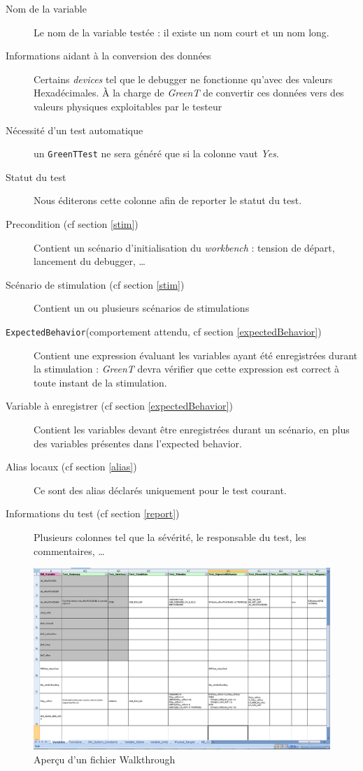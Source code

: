 		\begin{description} 
			\item[Nom de la variable] Le nom de la variable testée : il existe un nom court et un nom long.
			\item[Informations aidant à la conversion des données] Certains \textit{devices} tel que le debugger ne fonctionne qu'avec des valeurs Hexadécimales. À la charge de \textit{GreenT} de convertir ces données vers des valeurs physiques exploitables par le testeur
			\item[Nécessité d'un test automatique] un \texttt{GreenTTest} ne sera généré que si la colonne vaut \textit{Yes}.
			\item[Statut du test] Nous éditerons cette colonne afin de reporter le statut du test.
			\item[Precondition (cf section \ref{stim})] Contient un scénario d'initialisation du \textit{workbench} : tension de départ, lancement du debugger, \ldots
			\item[Scénario de stimulation (cf section \ref{stim})] Contient un ou plusieurs scénarios de stimulations
			\item[\texttt{ExpectedBehavior}(comportement attendu, cf section \ref{expectedBehavior})] Contient une expression évaluant les variables ayant été enregistrées durant la stimulation : \textit{GreenT} devra vérifier que cette expression est correct à toute instant de la stimulation.
			\item[Variable à enregistrer (cf section \ref{expectedBehavior})] Contient les variables devant être enregistrées durant un scénario, en plus des variables présentes dans l'expected behavior.
			\item[Alias locaux (cf section \ref{alias})] Ce sont des alias déclarés uniquement pour le test courant.
			\item[Informations du test (cf section \ref{report})] Plusieurs colonnes tel que la sévérité, le responsable du test, les commentaires, \ldots
		\end{description}

		\begin{figure}[H]
			\centering
			\includegraphics[width=18.5cm]{contents/images/walkthrough.png}
			\caption{Aperçu d'un fichier Walkthrough}
		\end{figure}

